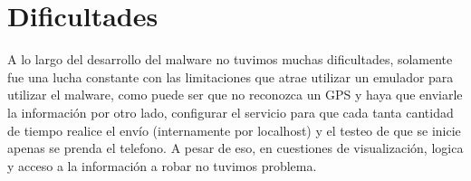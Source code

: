\section{Dificultades}

A lo largo del desarrollo del malware no tuvimos muchas dificultades, solamente fue una lucha constante con las limitaciones que atrae utilizar un emulador para utilizar el malware, como puede ser que no reconozca un GPS y haya que enviarle la información por otro lado, configurar el servicio para que cada tanta cantidad de tiempo realice el envío (internamente por localhost) y el testeo de que se inicie apenas se prenda el telefono. A pesar de eso, en cuestiones de visualización, logica y acceso a la información a robar no tuvimos problema.

